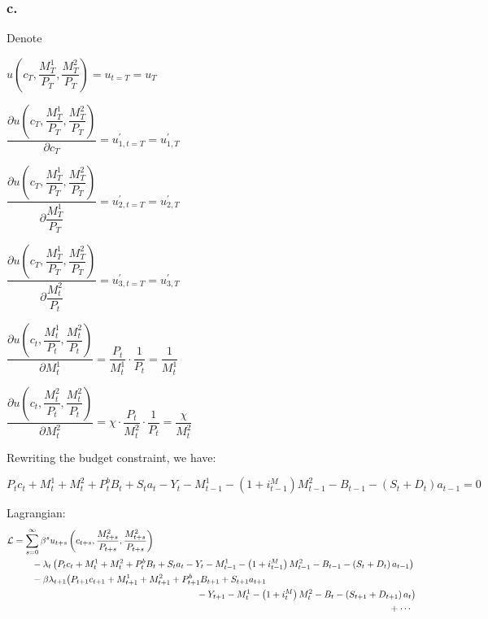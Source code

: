 \documentclass{article}
\begin{document}
\subsubsection*{c.}

Denote 

$u\left(c_{T}, \dfrac{M^{1}_{T}}{P_{T}}, \dfrac{M^{2}_{T}}{P_{T}}\right)=u_{t=T}=u_{T}$

$\dfrac{\partial u\left(c_{T}, \dfrac{M^{1}_{T}}{P_{T}}, \dfrac{M^{2}_{T}}{P_{T}}\right)}{\partial c_{T}}=u^{\prime}_{1,t=T}=u^{\prime}_{1,T}$

$\dfrac{\partial u\left(c_{T}, \dfrac{M^{1}_{T}}{P_{T}}, \dfrac{M^{2}_{T}}{P_{T}}\right)}{\partial \dfrac{M^{1}_{T}}{P_{T}}}=u^{\prime}_{2,t=T}=u^{\prime}_{2,T}$

$\dfrac{\partial u\left(c_{T}, \dfrac{M^{1}_{T}}{P_{T}}, \dfrac{M^{2}_{T}}{P_{T}}\right)}{\partial \dfrac{M^{2}_{t}}{P_{t}}}=u^{\prime}_{3,t=T}=u^{\prime}_{3,T}$

$\dfrac{\partial u\left(c_{t}, \dfrac{M^{1}_{t}}{P_{t}}, \dfrac{M^{2}_{t}}{P_{t}}\right)}{\partial M^{1}_{t}}=\dfrac{P_{t}}{M^{1}_{t}}\cdot \dfrac{1}{P_{t}}=\dfrac{1}{M^{1}_{t}}$

$\dfrac{\partial u\left(c_{t}, \dfrac{M^{2}_{t}}{P_{t}}, \dfrac{M^{2}_{t}}{P_{t}}\right)}{\partial M^{2}_{t}}=\chi\cdot\dfrac{P_{t}}{M^{2}_{t}}\cdot \dfrac{1}{P_{t}}=\dfrac{\chi}{M^{2}_{t}}$

Rewriting the budget constraint, we have:

$P_{t}c_{t}+M^{1}_{t}+M^{2}_{t}+P^{b}_{t}B_{t}+S_{t}a_{t}-Y_{t}-M^{1}_{t-1}-\left(1+i^{M}_{t-1}\right)M^{2}_{t-1}-B_{t-1}-\left(S_{t}+D_{t}\right)a_{t-1}=0$

Lagrangian:
\begin{alignat*}{1}
    \mathcal{L} &= \sum_{s=0}^{\infty}\beta^{s}u_{t+s}\left(c_{t+s}, \dfrac{M^{2}_{t+s}}{P_{t+s}}, \dfrac{M^{2}_{t+s}}{P_{t+s}}\right) \\
    &\qquad-\lambda_{t}\left(P_{t}c_{t}+M^{1}_{t}+M^{2}_{t}+P^{b}_{t}B_{t}+S_{t}a_{t}-Y_{t}-M^{1}_{t-1}-\left(1+i^{M}_{t-1}\right)M^{2}_{t-1}-B_{t-1}-\left(S_{t}+D_{t}\right)a_{t-1}\right)\\
    &\qquad-\beta\lambda_{t+1}\bigl(P_{t+1}c_{t+1}+M^{1}_{t+1}+M^{2}_{t+1}+P^{b}_{t+1}B_{t+1}+S_{t+1}a_{t+1} \notag\\
    &\qquad\qquad\qquad\qquad\qquad\qquad\qquad\qquad\quad\quad\quad\quad-Y_{t+1}-M^{1}_{t}-\left(1+i^{M}_{t}\right)M^{2}_{t}-B_{t}-\left(S_{t+1}+D_{t+1}\right)a_{t}\bigr)\\
    &\qquad\qquad\qquad\qquad\qquad\qquad\qquad\qquad\qquad\qquad\qquad\qquad\qquad\qquad\qquad\qquad\qquad\qquad\qquad\qquad\quad+\dotsb
\end{alignat*}
\end{document}
